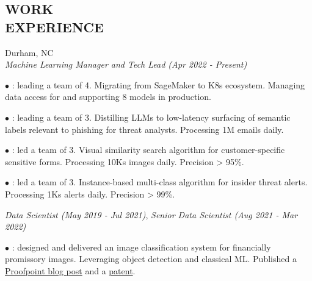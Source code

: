 \documentclass[resmargin]{resume_style_class} %
\newenvironment{outline}
  {\begin{list}{}{\setlength{\leftmargin}{30pt}\setlength\itemsep{-2pt}}}
  {\end{list}}
\begin{document}
\begin{resume}

 
\section{WORK \\ EXPERIENCE}
\begin{large}  \end{large} \hfill Durham, NC
\vspace{5pt} \\
\textit{Machine Learning Manager and Tech Lead (Apr 2022 - Present)}
\vspace{2pt}
\begin{outline}
	\item[$\bullet$\hspace{0.1cm}] : leading a team of 4. Migrating from SageMaker to K8s ecosystem. Managing data access for and supporting 8 models in production. 
	\item[$\bullet$\hspace{0.1cm}] : leading a team of 3. Distilling LLMs to low-latency surfacing of semantic labels relevant to phishing for threat analysts. Processing 1M emails daily.
	\item[$\bullet$\hspace{0.1cm}] : led a team of 3. Visual similarity search algorithm for customer-specific sensitive forms. Processing 10Ks images daily. Precision > 95\%. 
	\item[$\bullet$\hspace{0.1cm}] : led a team of 3. Instance-based multi-class algorithm for insider threat alerts. Processing 1Ks alerts daily. Precision > 99\%.
\end{outline} 
\textit{Data Scientist (May 2019 - Jul 2021)}, \textit{Senior Data Scientist (Aug 2021 - Mar 2022)}
\vspace{2pt}
\begin{outline}
	\item[$\bullet$\hspace{0.1cm}] : designed and delivered an image classification system for financially promissory images. Leveraging object detection and classical ML. Published a \href{https://www.proofpoint.com/us/blog/engineering-insights/development-of-the-promissory-images-classifier}{Proofpoint blog post} and a \href{https://image-ppubs.uspto.gov/dirsearch-public/print/downloadPdf/11526710}{patent}.

\end{outline}
\end{resume}
\end{document}
